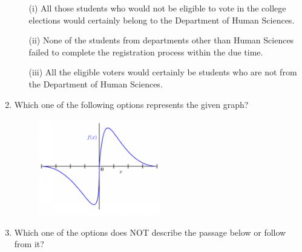 \documentclass[12pt]{article}
\theoremstyle{remark}
\begin{document}
\begin{enumerate}
\begin{enumerate}
\item [(i)] All those students who would not be eligible to vote in the college elections would certainly belong to the Department of Human Sciences.
\item [(ii)] None of the students from departments other than Human Sciences failed to complete the registration process within the due time.
\item [(iii)] All the eligible voters would certainly be students who are not from the Department of Human Sciences.
\end{enumerate} 
\begin{enumerate}  \end{enumerate}
\hfill{}
\item Which one of the following options represents the given graph?
\begin{figure}[H]
\centering
\includegraphics[width=0.5\textwidth]{Figs/Q7.png}
\caption{}
\label{fig:3.2}
\end{figure}
\begin{enumerate}  \end{enumerate}
\hfill{}
\item Which one of the options does NOT describe the passage below or follow from it?

\end{enumerate}
\end{document}
